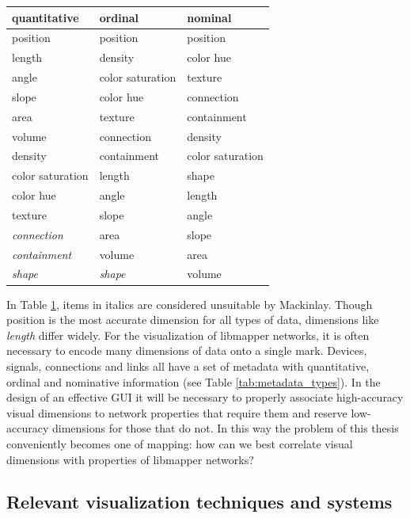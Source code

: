 \begin{table}
\setlength{\tabcolsep}{12pt}
	\centering
	\label{tab:graphical_rankings}
		\begin{tabular}{l l l}
		\textbf{quantitative}&	\textbf{ordinal}	&	\textbf{nominal}\\
		\hline\hline
		position 			& 	position 			&	position 		\\
		length 				& 	density 			&	color hue 		\\
		angle 				& 	color saturation 	&	texture 		\\
		slope				&	color hue 			&	connection 		\\
		area				&	texture				&	containment 	\\
		volume				&	connection 			&	density 		\\
		density				&	containment 		&	color saturation\\
		color saturation	&	length 				&	shape 			\\
		color hue			&	angle 				&	length 			\\
		texture				&	slope 				&	angle 			\\
		\emph{connection}	&	area 				&	slope 			\\
		\emph{containment}	&	volume 				&	area 			\\
		\emph{shape}		&	\emph{shape} 		&	volume 			\\
		\hline
	\end{tabular}
\end{table}

In Table \ref{tab:graphical_rankings}, items in italics are considered unsuitable by Mackinlay. Though position is the most accurate dimension for all types of data, dimensions like \emph{length} differ widely. For the visualization of libmapper networks, it is often necessary to encode many dimensions of data onto a single mark. Devices, signals, connections and links all have a set of metadata with quantitative, ordinal and nominative information (see Table \ref{tab:metadata_types}). In the design of an effective GUI it will be necessary to properly associate high-accuracy visual dimensions to network properties that require them and reserve low-accuracy dimensions for those that do not. In this way the problem of this thesis conveniently becomes one of mapping: how can we best correlate visual dimensions with properties of libmapper networks?

\subsection{Relevant visualization techniques and systems}
	\label{sec:color}

